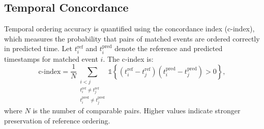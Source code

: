 

\subsection{Temporal Concordance}
\label{apd:temporal-concordance}

Temporal ordering accuracy is quantified using the concordance index (c-index), which
measures the probability that pairs of matched events are ordered correctly in predicted time.
Let $t^{\text{ref}}_i$ and $t^{\text{pred}}_i$ denote the reference and predicted timestamps for
matched event $i$. The c-index is:
\[
\text{c-index} = \frac{1}{N}
\sum_{\substack{i<j\\
t^{\text{ref}}_i \neq t^{\text{ref}}_j\\
t^{\text{pred}}_i \neq t^{\text{pred}}_j}}
\mathds{1}\!\left\{
(t^{\text{ref}}_i - t^{\text{ref}}_j)(t^{\text{pred}}_i - t^{\text{pred}}_j) > 0
\right\},
\]
where $N$ is the number of comparable pairs.  
Higher values indicate stronger preservation of reference ordering.

